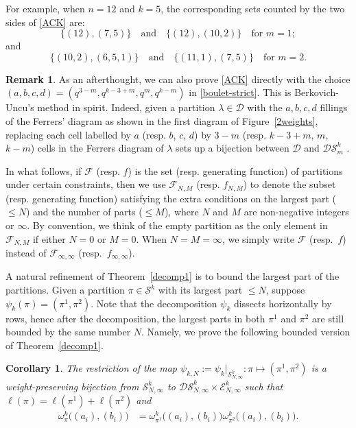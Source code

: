 \documentclass[12pt]{amsart}
\numberwithin{equation}{section}
\theoremstyle{plain}
\newtheorem{corollary}[theorem]{Corollary}
\theoremstyle{definition}
\newtheorem{remark}[theorem]{Remark}
\begin{document}
For example, when $n=12$ and $k=5$, the corresponding sets counted by the two sides 
of \eqref{ACK} are:
$$
\{(12), (7, 5)\}\quad \textrm{and} \quad \{(12), (10, 2)\}\quad \textrm{for $m=1$};
$$
and
$$
\{(10, 2), (6, 5, 1)\}\quad \textrm{and} \quad \{(11, 1), (7, 5)\}\quad \textrm{for $m=2$}.
$$
\begin{remark} 


As an afterthought, we can also prove \eqref{ACK} directly with the choice $(a,b,c,d) = (q^{3-m},q^{k-3+m},q^m,q^{k-m})$ in \eqref{boulet-strict}. This is Berkovich-Uncu's method in spirit. Indeed, given a partition $\lambda\in \mathcal{D}$ with the $a,b,c,d$ fillings of the Ferrers' diagram as shown in the first diagram of Figure~\ref{2weights}, replacing each cell labelled by $a$ (resp. $b$, $c$, $d$) by $3-m$ (resp. $k-3+m$, $m$, $k-m$) cells in the Ferrers diagram of $\lambda$ sets up a bijection 
between $\mathcal{D}$ and $\mathcal{DS}_m^k$ .





\end{remark}

In what follows, 
if $\mathcal{F}$  (resp. $f$) is the set (resp. generating function) 
of partitions under certain constraints, then we use $\mathcal{F}_{N,M}$ (resp. $f_{N,M}$) to denote the subset (resp.  generating function) satisfying the extra conditions on the largest part ($\leq N$) and the number of parts ($\leq M$), where $N$ and $M$ are non-negative integers or $\infty$. By convention, we think of the empty partition as the only element in $\mathcal{F}_{N,M}$ if either $N=0$ or $M=0$. When $N=M=\infty$, we simply write $\mathcal{F}$ (resp.~$f$) instead of $\mathcal{F}_{\infty, \infty}$ (resp.~$f_{\infty, \infty}$).

A natural refinement of Theorem~\ref{decomp1} is to bound the largest part of the partitions. Given a partition $\pi\in \mathcal{S}^k$ with its largest part $\leq N$, suppose $\psi_k(\pi)=(\pi^1,\pi^2)$. Note that the decomposition $\psi_k$ dissects horizontally by rows, hence after the decomposition, the largest parts in both $\pi^1$ and $\pi^2$ are still bounded by the same number $N$. Namely, we prove the following bounded version of Theorem~\ref{decomp1}.

\begin{corollary}\label{decomp1N}
The restriction of the 
 map $\psi_{k,N}:=\psi_k|_{\mathcal{S}_{N,\infty}^k}: \pi \longmapsto (\pi^1, \pi^2)$
  is a weight-preserving bijection from $\mathcal{S}_{N,\infty}^k$ to
  $\mathcal{DS}_{N,\infty}^k\times \mathcal{E}_{N,\infty}^k$
such that $\ell(\pi)=\ell(\pi^1)+\ell(\pi^2)$ and
\begin{align}
\omega^k_{\pi}\big((a_i), (b_i)\big) &=\omega^k_{\pi^1}\big((a_i), (b_i)\big) 
\omega^k_{\pi^2}\big((a_i), (b_i)\big) .
\end{align} 
\end{corollary}
\end{document}
